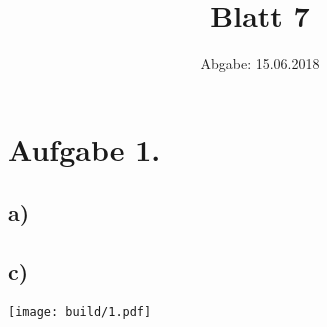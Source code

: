 

\title{Blatt 7}
\date{
  Abgabe: 15.06.2018
}



\parindent0mm
\section{Aufgabe 1.}
\subsection{a)}

\subsection{c)}
\texttt{[image: build/1.pdf]}

